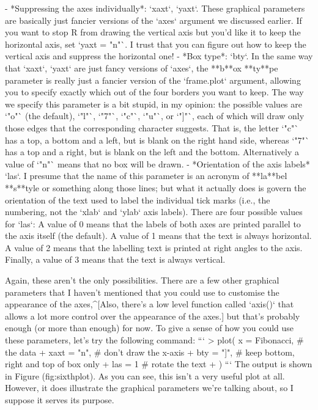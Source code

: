 - *Suppressing the axes individually*: `xaxt`, `yaxt`. These graphical parameters are basically just fancier versions of the `axes` argument we discussed earlier. If you want to stop R from drawing the vertical axis but you'd like it to keep the horizontal axis, set `yaxt = "n"`. I trust that you can figure out how to keep the vertical axis and suppress the horizontal one!
- *Box type*: `bty`. In the same way that `xaxt`, `yaxt` are just fancy versions of `axes`, the **b**ox **ty**pe parameter is really just a fancier version of the `frame.plot` argument, allowing you to specify exactly which out of the four borders you want to keep. The way we specify this parameter is a bit stupid, in my opinion: the  possible values are `"o"` (the default), `"l"`, `"7"`, `"c"`, `"u"`, or `"]"`, each of which will draw only those edges that the corresponding character suggests. That is, the letter `"c"` has a top, a bottom and a left, but is blank on the right hand side, whereas `"7"` has a top and a right, but is blank on the left and the bottom. Alternatively a value of `"n"` means that no box will be drawn.
- *Orientation of the axis labels* `las`. I presume that the name of this parameter is an acronym of **la**bel **s**tyle or something along those lines; but what it actually does is govern the orientation of the text used to label the individual tick marks (i.e., the numbering, not the `xlab` and `ylab` axis labels). There are four possible values for `las`: A value of 0 means that the labels of both axes are printed parallel to the axis itself (the default). A value of 1 means that the text is always horizontal. A value of 2 means that the labelling text is printed at right angles to the axis. Finally, a value of 3 means that the text is always vertical. 

Again, these aren't the only possibilities. There are a few other graphical parameters that I haven't mentioned that you could use to customise the appearance of the axes,^[Also, there's a low level function called `axis()` that allows a lot more control over the appearance of the axes.] but that's probably enough (or more than enough) for now. To give a sense of how you could use these parameters, let's try the following command:
```
> plot( x = Fibonacci,   # the data
+       xaxt = "n",      # don't draw the x-axis
+       bty = "]",       # keep bottom, right and top of box only
+       las = 1          # rotate the text
+ )
```
The output is shown in Figure \@ref(fig:sixthplot). As you can see, this isn't a very useful plot at all. However, it does illustrate the graphical parameters we're talking about, so I suppose it serves its purpose.




